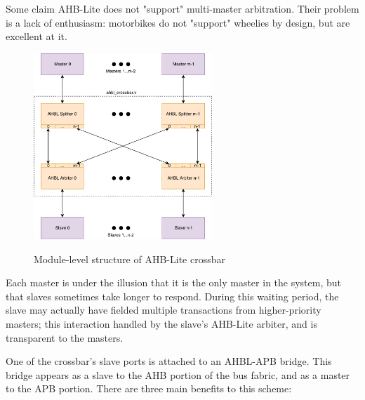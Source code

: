 \documentclass[notitlepage]{article}
\begin{document}
Some claim AHB-Lite does not "support" multi-master arbitration. Their problem is a lack of enthusiasm: motorbikes do not "support" wheelies by design, but are excellent at it.

\begin{figure}[!htb]
\centering
\caption{Module-level structure of AHB-Lite crossbar} \includegraphics[width=0.6\textwidth]{diagrams/crossbar_structure.pdf}
\label{diagram:crossbar_structure}
\end{figure}

Each master is under the illusion that it is the only master in the system, but that slaves sometimes take longer to respond. During this waiting period, the slave may actually have fielded multiple transactions from higher-priority masters; this interaction handled by the slave's AHB-Lite arbiter, and is transparent to the masters.

One of the crossbar's slave ports is attached to an AHBL-APB bridge. This bridge appears as a slave to the AHB portion of the bus fabric, and as a master to the APB portion. There are three main benefits to this scheme:
\end{document}
